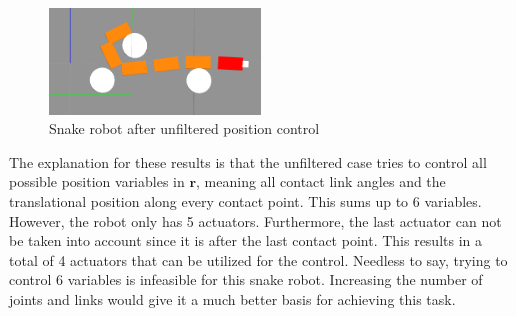\begin{figure}
    \centering
    \includegraphics[width=0.5\textwidth]{figures/experiments/single_pos/gazebo_single_pos_nofilter.png}
    \caption{Snake robot after unfiltered position control}
    \label{fig:singlepos-gazebo-nofilter}
\end{figure}

The explanation for these results is that the unfiltered case tries to control all possible position variables in $\mathbf{r}$, meaning all contact link angles and the translational position along every contact point. This sums up to 6 variables. However, the robot only has 5 actuators. Furthermore, the last actuator can not be taken into account since it is after the last contact point. This results in a total of 4 actuators that can be utilized for the control. 
Needless to say, trying to control 6 variables is infeasible for this snake robot. Increasing the number of joints and links would give it a much better basis for achieving this task.






